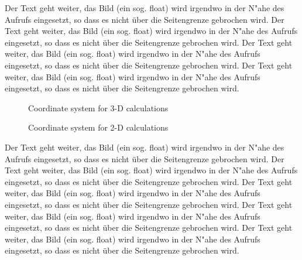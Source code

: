 \documentclass[12pt, a4paper]{article}
\begin{document}
%
% 
%
Der Text geht weiter, das Bild (ein sog. float) wird irgendwo in der N"ahe des
Aufrufs eingesetzt, so dass es nicht \"uber die Seitengrenze gebrochen wird.
Der Text geht weiter, das Bild (ein sog. float) wird irgendwo in der N"ahe des
Aufrufs eingesetzt, so dass es nicht \"uber die Seitengrenze gebrochen wird.
Der Text geht weiter, das Bild (ein sog. float) wird irgendwo in der N"ahe des
Aufrufs eingesetzt, so dass es nicht \"uber die Seitengrenze gebrochen wird.
Der Text geht weiter, das Bild (ein sog. float) wird irgendwo in der N"ahe des
Aufrufs eingesetzt, so dass es nicht \"uber die Seitengrenze gebrochen wird.
\begin{figure}[bh]
  \centering
  \parbox{60mm}{
    \centering
    \caption{Coordinate system for 3-D calculations}
  }
  \hfill  %
  \parbox{60mm}{
    \centering
    \caption{Coordinate system for 2-D calculations}
  }
\end{figure}
Der Text geht weiter, das Bild (ein sog. float) wird irgendwo in der N"ahe des
Aufrufs eingesetzt, so dass es nicht \"uber die Seitengrenze gebrochen wird.
Der Text geht weiter, das Bild (ein sog. float) wird irgendwo in der N"ahe des
Aufrufs eingesetzt, so dass es nicht \"uber die Seitengrenze gebrochen wird.
Der Text geht weiter, das Bild (ein sog. float) wird irgendwo in der N"ahe des
Aufrufs eingesetzt, so dass es nicht \"uber die Seitengrenze gebrochen wird.
Der Text geht weiter, das Bild (ein sog. float) wird irgendwo in der N"ahe des
Aufrufs eingesetzt, so dass es nicht \"uber die Seitengrenze gebrochen wird.
Der Text geht weiter, das Bild (ein sog. float) wird irgendwo in der N"ahe des
Aufrufs eingesetzt, so dass es nicht \"uber die Seitengrenze gebrochen wird.
 
\end{document}
